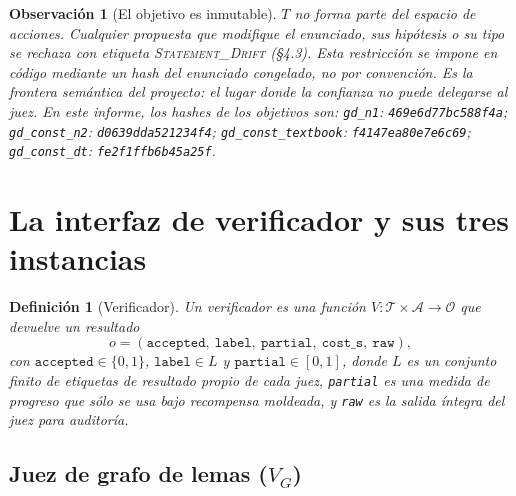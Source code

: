 \documentclass[11pt,a4paper]{article}
\newtheorem{definition}{Definición}
\newtheorem{remark}{Observación}
\begin{document}
\begin{remark}[El objetivo es inmutable]
$T$ no forma parte del espacio de acciones. Cualquier propuesta que modifique el enunciado, sus hipótesis o su tipo se rechaza con etiqueta \textsc{Statement\_Drift} (§4.3). Esta restricción se impone en código mediante un hash del enunciado congelado, no por convención. Es la \emph{frontera semántica} del proyecto: el lugar donde la confianza no puede delegarse al juez.
\sloppy En este informe, los hashes de los objetivos son: \texttt{gd\_\allowbreak{}n1}: \texttt{469e6d77bc588f4a}; \texttt{gd\_\allowbreak{}const\_\allowbreak{}n2}: \texttt{d0639dda521234f4}; \texttt{gd\_\allowbreak{}const\_\allowbreak{}textbook}: \texttt{f4147ea80e7e6c69}; \texttt{gd\_\allowbreak{}const\_\allowbreak{}dt}: \texttt{fe2f1ffb6b45a25f}.
\end{remark}

\section{La interfaz de verificador y sus tres instancias}

\begin{definition}[Verificador]
Un verificador es una función $V : \mathcal{T} \times \mathcal{A} \to \mathcal{O}$ que devuelve un \emph{resultado}
\[
  o = (\texttt{accepted},\ \texttt{label},\ \texttt{partial},\ \texttt{cost\_s},\ \texttt{raw}),
\]
con $\texttt{accepted}\in\{0,1\}$, $\texttt{label}\in L$ y $\texttt{partial}\in[0,1]$,
donde $L$ es un conjunto finito de etiquetas de resultado propio de cada juez, \texttt{partial} es una medida de progreso que sólo se usa bajo recompensa moldeada, y \texttt{raw} es la salida íntegra del juez para auditoría.
\end{definition}

\subsection{Juez de grafo de lemas ($V_G$)}
\end{document}
